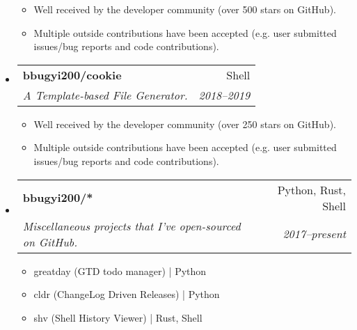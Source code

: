 \documentclass[letterpaper,11pt]{article}
\makeatletter
\newcommand{\ressubheading}[4]{
\begin{tabular*}{6.5in}{l@{\cftdotfill{\cftsecdotsep}\extracolsep{\fill}}r}
		\textbf{#1} & #2 \\
		\textit{#3} & \textit{#4} \\
\end{tabular*}\vspace{-6pt}}
\makeatother
\begin{document}
\begin{itemize}
\begin{itemize}
        \item
            Well received by the developer community (over 500 stars on GitHub).
        \item
            Multiple outside contributions have been accepted (e.g. user submitted issues/bug reports and code contributions).
    \end{itemize}
\item \ressubheading{bbugyi200/cookie}{Shell}{A Template-based File Generator.}{2018--2019}
    \begin{itemize}
        \item
            Well received by the developer community (over 250 stars on GitHub).
        \item
            Multiple outside contributions have been accepted (e.g. user submitted issues/bug reports and code contributions).
    \end{itemize}
\item \ressubheading{bbugyi200/*}{Python, Rust, Shell}{Miscellaneous projects that I've open-sourced on GitHub.}{2017--present}
    \begin{itemize}[noitemsep]
        \item greatday (GTD todo manager) | Python
        \item cldr (ChangeLog Driven Releases) | Python
        \item shv (Shell History Viewer) | Rust, Shell
    \end{itemize}
\end{itemize}
\end{document}
